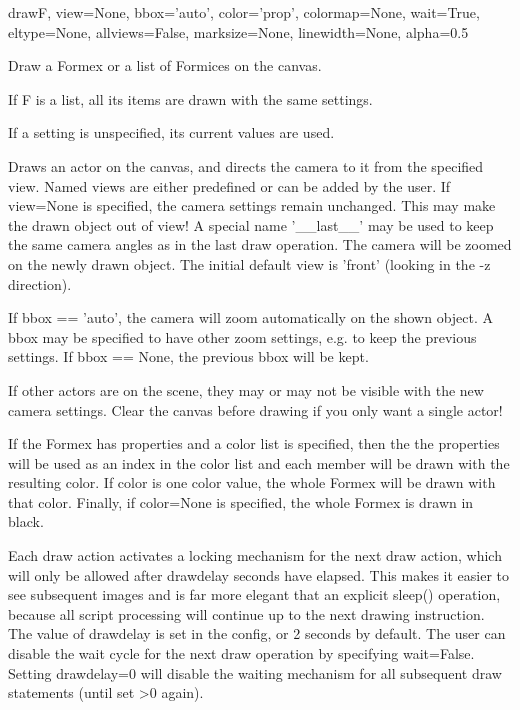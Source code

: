  
\begin{funcdesc}{draw}{F, view=None, bbox='auto', color='prop', colormap=None, wait=True, eltype=None, allviews=False, marksize=None, linewidth=None, alpha=0.5}

Draw a Formex or a list of Formices on the canvas.

    If F is a list, all its items are drawn with the same settings.

    If a setting is unspecified, its current values are used.
    
    Draws an actor on the canvas, and directs the camera to it from
    the specified view. Named views are either predefined or can be added by
    the user.
    If view=None is specified, the camera settings remain unchanged.
    This may make the drawn object out of view!
    A special name '__last__' may be used to keep the same camera angles
    as in the last draw operation. The camera will be zoomed on the newly
    drawn object.
    The initial default view is 'front' (looking in the -z direction).

    If bbox == 'auto', the camera will zoom automatically on the shown
    object. A bbox may be specified to have other zoom settings, e.g. to
    keep the previous settings. If bbox == None, the previous bbox will be
    kept.

    If other actors are on the scene, they may or may not be visible with the
    new camera settings. Clear the canvas before drawing if you only want
    a single actor!

    If the Formex has properties and a color list is specified, then the
    the properties will be used as an index in the color list and each member
    will be drawn with the resulting color.
    If color is one color value, the whole Formex will be drawn with
    that color.
    Finally, if color=None is specified, the whole Formex is drawn in black.
    
    Each draw action activates a locking mechanism for the next draw action,
    which will only be allowed after drawdelay seconds have elapsed. This
    makes it easier to see subsequent images and is far more elegant that an
    explicit sleep() operation, because all script processing will continue
    up to the next drawing instruction.
    The value of drawdelay is set in the config, or 2 seconds by default.
    The user can disable the wait cycle for the next draw operation by
    specifying wait=False. Setting drawdelay=0 will disable the waiting
    mechanism for all subsequent draw statements (until set >0 again).

\end{funcdesc}


